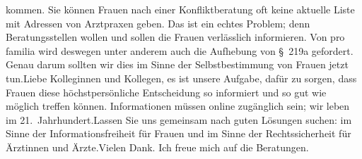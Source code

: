 \documentclass{article}
\begin{document}
kommen. Sie können Frauen nach einer Konfliktberatung oft keine aktuelle Liste mit Adressen von Arztpraxen geben. Das ist ein echtes Problem; denn Beratungsstellen wollen und sollen die Frauen verlässlich informieren. Von pro familia wird deswegen unter anderem auch die Aufhebung von § 219a gefordert. Genau darum sollten wir dies im Sinne der Selbstbestimmung von Frauen jetzt tun.Liebe Kolleginnen und Kollegen, es ist unsere Aufgabe, dafür zu sorgen, dass Frauen diese höchstpersönliche Entscheidung so informiert und so gut wie möglich treffen können. Informationen müssen online zugänglich sein; wir leben im 21. Jahrhundert.Lassen Sie uns gemeinsam nach guten Lösungen suchen: im Sinne der Informationsfreiheit für Frauen und im Sinne der Rechtssicherheit für Ärztinnen und Ärzte.Vielen Dank. Ich freue mich auf die Beratungen.
\end{document}
